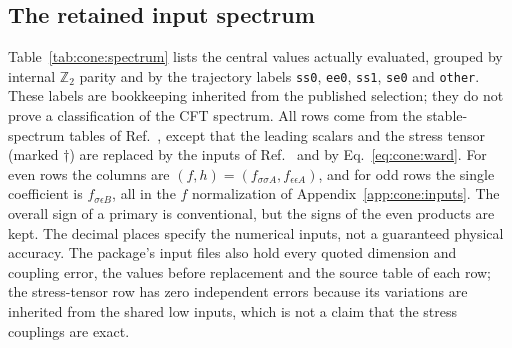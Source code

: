 \documentclass[11pt,a4paper]{article}
\numberwithin{equation}{section}
\begin{document}
\subsection{The retained input spectrum}\label{app:cone:spectrum}
Table~\ref{tab:cone:spectrum} lists the central values actually evaluated, grouped by internal $\mathbb Z_2$ parity and
by the trajectory labels \texttt{ss0}, \texttt{ee0}, \texttt{ss1}, \texttt{se0} and \texttt{other}. These labels are
bookkeeping inherited from the published selection; they do not prove a classification of the CFT spectrum. All rows
come from the stable-spectrum tables of Ref.~\cite{Simmons-Duffin:2016wlq}, except that the leading scalars and the
stress tensor (marked $\dagger$) are replaced by the inputs of Ref.~\cite{Chang:2024whx} and by
Eq.~\eqref{eq:cone:ward}. For even rows the columns are $(f,h)=(f_{\sigma\sigma A},f_{\epsilon\epsilon A})$, and for odd
rows the single coefficient is $f_{\sigma\epsilon B}$, all in the $f$ normalization of Appendix~\ref{app:cone:inputs}. The
overall sign of a primary is conventional, but the signs of the even products are kept. The decimal places specify the
numerical inputs, not a guaranteed physical accuracy. The package's input files also hold every quoted dimension and
coupling error, the values before replacement and the source table of each row; the stress-tensor row has zero
independent errors because its variations are inherited from the shared low inputs, which is not a claim that the
stress couplings are exact.
\end{document}
